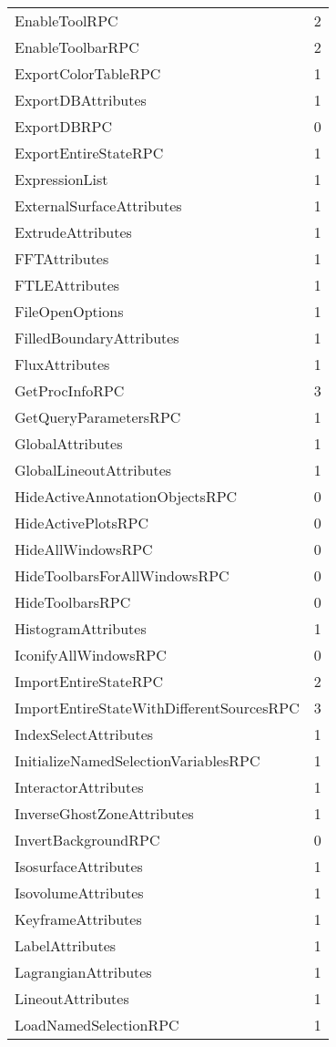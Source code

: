\documentclass[10pt,a4paper]{report}
\begin{document}
\begin{longtable}{ll}
EnableToolRPC & 2 \\
EnableToolbarRPC & 2 \\
ExportColorTableRPC & 1 \\
ExportDBAttributes & 1 \\
ExportDBRPC & 0 \\
ExportEntireStateRPC & 1 \\
ExpressionList & 1 \\
ExternalSurfaceAttributes & 1 \\
ExtrudeAttributes & 1 \\
FFTAttributes & 1 \\
FTLEAttributes & 1 \\
FileOpenOptions & 1 \\
FilledBoundaryAttributes & 1 \\
FluxAttributes & 1 \\
GetProcInfoRPC & 3 \\
GetQueryParametersRPC & 1 \\
GlobalAttributes & 1 \\
GlobalLineoutAttributes & 1 \\
HideActiveAnnotationObjectsRPC & 0 \\
HideActivePlotsRPC & 0 \\
HideAllWindowsRPC & 0 \\
HideToolbarsForAllWindowsRPC & 0 \\
HideToolbarsRPC & 0 \\
HistogramAttributes & 1 \\
IconifyAllWindowsRPC & 0 \\
ImportEntireStateRPC & 2 \\
ImportEntireStateWithDifferentSourcesRPC & 3 \\
IndexSelectAttributes & 1 \\
InitializeNamedSelectionVariablesRPC & 1 \\
InteractorAttributes & 1 \\
InverseGhostZoneAttributes & 1 \\
InvertBackgroundRPC & 0 \\
IsosurfaceAttributes & 1 \\
IsovolumeAttributes & 1 \\
KeyframeAttributes & 1 \\
LabelAttributes & 1 \\
LagrangianAttributes & 1 \\
LineoutAttributes & 1 \\
LoadNamedSelectionRPC & 1 \\

\end{longtable}
\end{document}
